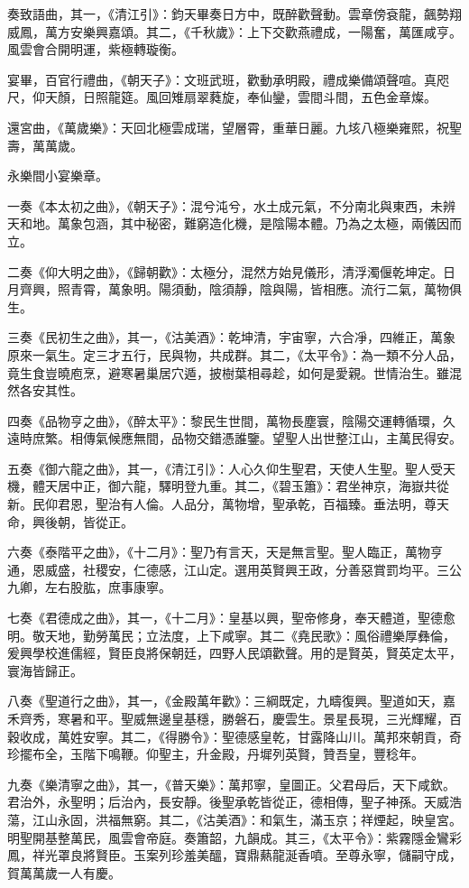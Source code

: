 奏致語曲，其一，《清江引》：鈞天畢奏日方中，既醉歡聲動。雲章傍袞龍，飆勢翔威鳳，萬方安樂興嘉頌。其二，《千秋歲》：上下交歡燕禮成，一陽奮，萬匯咸亨。風雲會合開明運，紫極轉璇衡。

宴畢，百官行禮曲，《朝天子》：文班武班，歡動承明殿，禮成樂備頌聲喧。真咫尺，仰天顏，日照龍筵。風回雉扇翠蕤旋，奉仙鑾，雲間斗間，五色金章燦。

還宮曲，《萬歲樂》：天回北極雲成瑞，望層霄，重華日麗。九垓八極樂雍熙，祝聖壽，萬萬歲。

永樂間小宴樂章。

一奏《本太初之曲》，《朝天子》：混兮沌兮，水土成元氣，不分南北與東西，未辨天和地。萬象包涵，其中秘密，難窮造化機，是陰陽本體。乃為之太極，兩儀因而立。

二奏《仰大明之曲》，《歸朝歡》：太極分，混然方始見儀形，清浮濁偃乾坤定。日月齊興，照青霄，萬象明。陽須動，陰須靜，陰與陽，皆相應。流行二氣，萬物俱生。

三奏《民初生之曲》，其一，《沽美酒》：乾坤清，宇宙寧，六合凈，四維正，萬象原來一氣生。定三才五行，民與物，共成群。其二，《太平令》：為一類不分人品，竟生食豈曉庖烹，避寒暑巢居穴遁，披樹葉相尋趁，如何是愛親。世情治生。雖混然各安其性。

四奏《品物亨之曲》，《醉太平》：黎民生世間，萬物長塵寰，陰陽交運轉循環，久遠時庶繁。相傳氣候應無間，品物交錯憑誰鑒。望聖人出世整江山，主萬民得安。

五奏《御六龍之曲》，其一，《清江引》：人心久仰生聖君，天使人生聖。聖人受天機，體天居中正，御六龍，驛明登九重。其二，《碧玉簫》：君坐神京，海嶽共從新。民仰君恩，聖治有人倫。人品分，萬物增，聖承乾，百福臻。垂法明，尊天命，興後朝，皆從正。

六奏《泰階平之曲》，《十二月》：聖乃有言天，天是無言聖。聖人臨正，萬物亨通，恩威盛，社稷安，仁德感，江山定。選用英賢興王政，分善惡賞罰均平。三公九卿，左右股肱，庶事康寧。

七奏《君德成之曲》，其一，《十二月》：皇基以興，聖帝修身，奉天體道，聖德愈明。敬天地，勤勞萬民；立法度，上下咸寧。其二《堯民歌》：風俗禮樂厚彝倫，爰興學校進儒經，賢臣良將保朝廷，四野人民頌歡聲。用的是賢英，賢英定太平，寰海皆歸正。

八奏《聖道行之曲》，其一，《金殿萬年歡》：三綱既定，九疇復興。聖道如天，嘉禾齊秀，寒暑和平。聖威無邊皇基穩，勝磐石，慶雲生。景星長現，三光輝耀，百穀收成，萬姓安寧。其二，《得勝令》：聖德感皇乾，甘露降山川。萬邦來朝貢，奇珍擺布全，玉階下鳴鞭。仰聖主，升金殿，丹墀列英賢，贊吾皇，豐稔年。

九奏《樂清寧之曲》，其一，《普天樂》：萬邦寧，皇圖正。父君母后，天下咸欽。君治外，永聖明；后治內，長安靜。後聖承乾皆從正，德相傳，聖子神孫。天威浩蕩，江山永固，洪福無窮。其二，《沽美酒》：和氣生，滿玉京；祥煙起，映皇宮。明聖開基整萬民，風雲會帝庭。奏簫韶，九韻成。其三，《太平令》：紫霧隱金鸞彩鳳，祥光罩良將賢臣。玉案列珍羞美醞，寶鼎爇龍涎香噴。至尊永寧，儲嗣守成，賀萬萬歲一人有慶。


